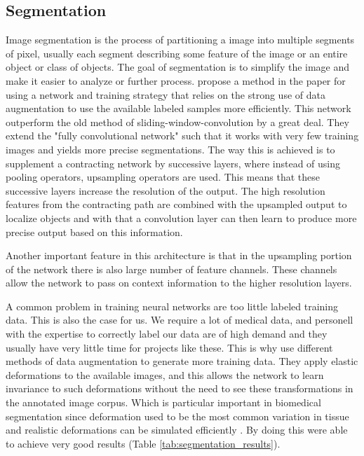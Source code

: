 \documentclass[thesis.tex]{subfiles}
\begin{document}
\subsection{Segmentation} \label{segmentation}
Image segmentation is the process of partitioning a image into multiple segments of pixel, usually each segment describing some feature of the image or an entire object or class of objects. The goal of segmentation is to simplify the image and make it easier to analyze or further process. \citeauthor*{UNetConvolutional15} propose a method in the paper  \cite{UNetConvolutional15} for using a network and training strategy that relies on the strong use of data augmentation to use the available labeled samples more efficiently. This network outperform the old method of sliding-window-convolution by a great deal. They extend the "fully convolutional network" \cite{FullyConvolutional15} such that it works with very few training images and yields more precise segmentations. The way this is achieved is to supplement a contracting network by successive layers, where instead of using pooling operators, upsampling operators are used. This means that these successive layers increase the resolution of the output. The high resolution features from the contracting path are combined with the upsampled output to localize objects and with that a convolution layer can then learn to produce more precise output based on this information. 

Another important feature in this architecture is that in the upsampling portion of the network there is also large number of feature channels. These channels allow the network to pass on context information to the higher resolution layers. 

A common problem in training neural networks are too little labeled training data. This is also the case for us. We require a lot of medical data, and personell with the expertise to correctly label our data are of high demand and they usually have very little time for projects like these. This is why \citeauthor*{UNetConvolutional15} use different methods of data augmentation to generate more training data. They apply elastic deformations to the available images, and this allows the network to learn invariance to such deformations without the need to see these transformations in the annotated image corpus. Which is particular important in biomedical segmentation since deformation used to be the most common variation in tissue and realistic deformations can be simulated efficiently \cite{UNetConvolutional15}. By doing this \citeauthor*{UNetConvolutional15} were able to achieve very good results (Table \ref{tab:segmentation_results}).
\end{document}
